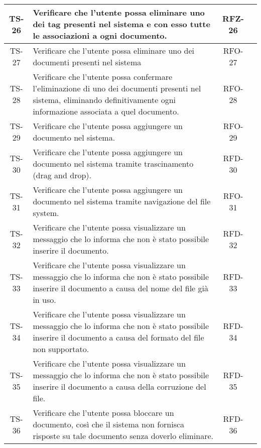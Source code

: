 \begin{xltabular}{\textwidth}{| c | X | c | c |}
    \hline
    TS-26 & Verificare che l’utente possa eliminare uno dei tag presenti nel sistema e con esso tutte le associazioni a ogni documento. & RFZ-26 & \textcolor{xmarkcolor}{} \\
    \hline
    TS-27 & Verificare che l’utente possa eliminare uno dei documenti presenti nel sistema & RFO-27 & \textcolor{cmarkcolor}{} \\
    \hline
    TS-28 & Verificare che l’utente possa confermare l’eliminazione di uno dei documenti presenti nel sistema, eliminando definitivamente  ogni informazione associata a quel documento. & RFO-28 & \textcolor{cmarkcolor}{} \\
    \hline
    TS-29 & Verificare che l’utente possa aggiungere un documento nel sistema. & RFO-29 & \textcolor{cmarkcolor}{} \\
    \hline
    TS-30 & Verificare che l’utente possa aggiungere un documento nel sistema tramite trascinamento (drag and drop). & RFD-30 & \textcolor{cmarkcolor}{} \\
    \hline
    TS-31 & Verificare che l’utente possa aggiungere un documento nel sistema tramite navigazione del file system. & RFO-31 & \textcolor{cmarkcolor}{} \\
    \hline
    TS-32 & Verificare che l'utente possa visualizzare un messaggio che lo informa che non è stato possibile inserire il documento. & RFD-32 & \textcolor{cmarkcolor}{} \\
    \hline
    TS-33 & Verificare che l'utente possa visualizzare un messaggio che lo informa che non è stato possibile inserire il documento a causa del nome del file già in uso. & RFD-33 & \textcolor{xmarkcolor}{} \\
    \hline
    TS-34 & Verificare che l’utente possa visualizzare un messaggio che lo informa che non è stato possibile inserire il documento a causa del formato del file non supportato. & RFD-34 & \textcolor{cmarkcolor}{} \\
    \hline
    TS-35 & Verificare che l’utente possa visualizzare un messaggio che lo informa che non è stato possibile inserire il documento a causa della corruzione del file. & RFD-35 & \textcolor{xmarkcolor}{} \\
    \hline
    TS-36 & Verificare che l'utente possa bloccare un documento, così che il sistema non fornisca risposte su tale documento senza doverlo eliminare. & RFD-36 & \textcolor{cmarkcolor}{} \\

\end{xltabular}
